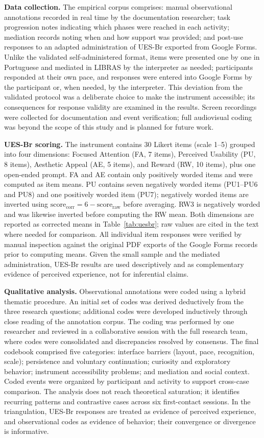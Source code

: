 \documentclass{llncs}
\begin{document}
\textbf{Data collection.} The empirical corpus comprises: manual observational
annotations recorded in real time by the documentation researcher; task progression notes
indicating which phases were reached in each activity; mediation records noting when and
how support was provided; and post-use responses to an adapted administration of UES-Br exported from Google
Forms. Unlike the validated self-administered format, items were presented one by one in Portuguese
and mediated in LIBRAS by the interpreter as needed; participants responded at
their own pace, and responses were entered into Google Forms by the participant or, when
needed, by the interpreter. This deviation from the validated protocol was a deliberate
choice to make the instrument accessible; its consequences for response validity are
examined in the results. Screen recordings were collected for documentation and event
verification; full audiovisual coding was beyond the scope of this study and is planned
for future work.

\textbf{UES-Br scoring.} The instrument contains 30 Likert items (scale 1--5) grouped
into four dimensions: Focused Attention (FA, 7 items), Perceived Usability (PU, 8
items), Aesthetic Appeal (AE, 5 items), and Reward (RW, 10 items), plus one open-ended
prompt. FA and AE contain only positively worded items and were computed as item means.
PU contains seven negatively worded items (PU1--PU6 and PU8) and one positively worded
item (PU7); negatively worded items are inverted using
$\text{score}_{\text{corr}} = 6 - \text{score}_{\text{raw}}$ before averaging. RW3 is
negatively worded and was likewise inverted before computing the RW mean. Both dimensions
are reported as corrected means in Table~\ref{tab:uesbr}; raw values are cited in the
text where needed for comparison. All individual item responses were verified by manual inspection against
the original PDF exports of the Google Forms records prior to computing means. Given the
small sample and the mediated administration, UES-Br results are used descriptively and
as complementary evidence of perceived experience, not for inferential claims.

\textbf{Qualitative analysis.} Observational annotations were coded using a hybrid
thematic procedure. An initial set of codes was derived deductively from the three
research questions; additional codes were developed inductively through close reading of
the annotation corpus. The coding was performed by one researcher and reviewed in a
collaborative session with the full research team, where codes were consolidated and
discrepancies resolved by consensus. The final codebook comprised five categories:
interface barriers (layout, pace, recognition, scale); persistence and voluntary
continuation; curiosity and exploratory behavior; instrument accessibility problems; and
mediation and social context. Coded events were organized by participant and activity to
support cross-case comparison. The analysis does not reach theoretical saturation; it
identifies recurring patterns and contrastive cases across six first-contact sessions. In
the triangulation, UES-Br responses are treated as evidence of perceived experience, and observational codes as evidence of behavior; their convergence or divergence is informative.
\end{document}
